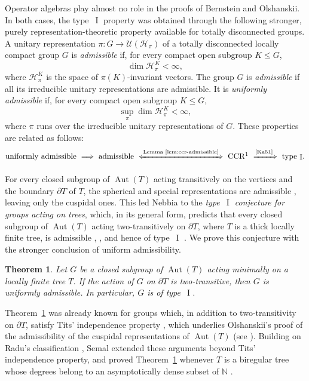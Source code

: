 \documentclass[11pt]{amsart}
\numberwithin{equation}{section}
\newcommand{\nn}{\mathbb N}
\renewcommand{\H}{\mathcal H}
\newcommand{\U}{\mathcal U}
\DeclareMathOperator{\I}{I}
\DeclareMathOperator{\Aut}{Aut}
\newtheorem{mainthm}{Theorem}
\theoremstyle{definition}
\begin{document}
Operator algebras play almost no role in the proofs of Bernstein and Olshanskii. In both cases, the type~$\I$ property was obtained through the following stronger, purely representation-theoretic property available for totally disconnected groups. A unitary representation $\pi:G\to\U(\H_\pi)$ of a totally disconnected locally compact group $G$ is \emph{admissible} if, for every compact open subgroup $K\leq G$,
$$
    \dim\H_\pi^K<\infty,
$$
where $\H_\pi^K$ is the space of $\pi(K)$-invariant vectors. The group $G$ is \emph{admissible} if all its irreducible unitary representations are admissible. It is \emph{uniformly admissible} if, for every compact open subgroup $K\leq G$,
$$
    \sup_\pi\dim\H_\pi^K<\infty,
$$
where $\pi$ runs over the irreducible unitary representations of $G$. These properties are related as follows:
$$
    \text{uniformly admissible}\ \Longrightarrow\ \text{admissible}\ \xLeftrightarrow{\text{Lemma~\ref{lem:ccr-admissible}}}\ \text{\textup{CCR}}\footnotemark\ \xRightarrow{\text{\cite{Ka51}}}\ \text{type~$\I$}.
$$

For every closed subgroup of $\Aut(T)$ acting transitively on the vertices and the boundary $\partial T$ of $T$, the spherical and special representations are admissible \cite{FN91}, leaving only the cuspidal ones. This led Nebbia to the \emph{type~$\I$ conjecture for groups acting on trees}, which, in its general form, predicts that every closed subgroup of $\Aut(T)$ acting two-transitively on $\partial T$, where $T$ is a thick locally finite tree, is admissible \cite[p.~311]{Ne99}, \cite[Problem~20.8.2]{CM18}, and hence of type~$\I$ \cite[Problem~20.8.3]{CM18}. We prove this conjecture with the stronger conclusion of uniform admissibility.

\begin{mainthm}
    \label{thm:main}
    Let $G$ be a closed subgroup of $\Aut(T)$ acting minimally on a locally finite tree $T$. If the action of $G$ on $\partial T$ is two-transitive, then $G$ is uniformly admissible. In particular, $G$ is of type~$\I$.
\end{mainthm}

Theorem~\ref{thm:main} was already known for groups which, in addition to two-transitivity on $\partial T$, satisfy Tits' independence property \cite{Ti70}, which underlies Olshanskii's proof of the admissibility of the cuspidal representations of $\Aut(T)$ \cite{Ol77} (see \cite{Am03,De04,Ci15}). Building on Radu's classification \cite{Ra17}, Semal extended these arguments beyond Tits' independence property, and proved Theorem~\ref{thm:main} whenever $T$ is a biregular tree whose degrees belong to an asymptotically dense subset of $\nn$ \cite[Theorems~A and~B]{Semal24}.
\end{document}
